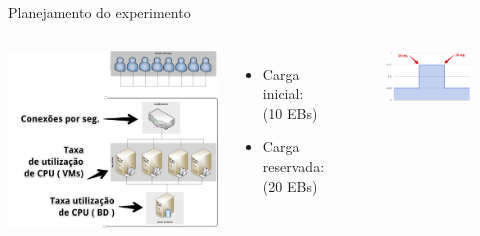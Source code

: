 \begin{frame}{Planejamento do experimento}
	\begin{columns}
		\begin{minipage}[c][0.4\textheight][c]{\linewidth}
			\centering
			\includegraphics[scale=0.15]{images/metricas-arquitetura-experimento2.png}		
		\end{minipage}
		\begin{minipage}[c][0.4\textheight][c]{\linewidth}
			\begin{itemize}
				\item Carga inicial: (10 EBs)
				\item Carga reservada: (20 EBs)
			\end{itemize}
			\begin{figure}
				\centering
				\includegraphics[scale=0.5]{images/carga-modulada-experimento.png}
			\end{figure}
			
		\end{minipage}		
	\end{columns}
	
\end{frame}

